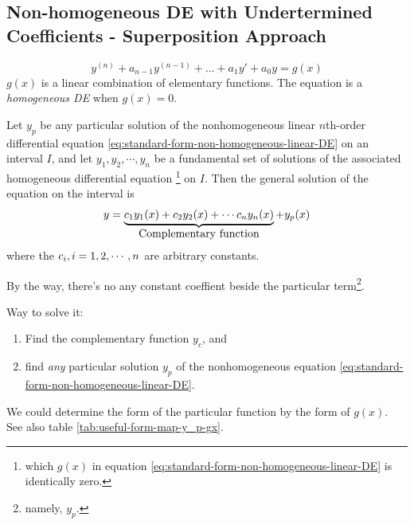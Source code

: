 \subsection{Non-homogeneous DE with Undertermined Coefficients - Superposition Approach}

\begin{definition}
    \label{def:non-homo-linear-DE}
    \begin{equation}\label{eq:standard-form-non-homogeneous-linear-DE}
        y^{(n)} + a_{n-1}y^{(n-1)} + \ldots + a_1y' + a_0y = g(x)
    \end{equation}
    $g(x)$ is a linear combination of elementary functions.
    The equation is a \emph{homogeneous DE} 
    when $g(x) = 0$.
\end{definition}

\begin{theorem}
    \label{general-sln-non-homo-DE}
    Let $y_p$  be any particular solution of 
    the nonhomogeneous linear $n$th-order
    differential equation \ref{eq:standard-form-non-homogeneous-linear-DE}
    on an interval $I$, 
    and let $y_1, y_2, \cdots, y_n$ be a fundamental set of 
    solutions of the associated homogeneous differential equation
    \footnote{
        which $g(x)$ in equation 
        \ref{eq:standard-form-non-homogeneous-linear-DE} 
        is identically zero.
    }
    on $I$.
    Then the general solution of the equation on the interval is
    \[
        y = 
        \underbrace{
            c_1 y_1(x) +
            c_2 y_2(x) +
            \cdots
            c_n y_n(x) 
        }_{\mathclap{\mbox{
            Complementary function
        }}}
        + y_p(x)
    \]
    where the $\cramped{c_i}, i = 1, 2, \cdots, n$ are arbitrary constants.
\end{theorem}
By the way, there's no any constant coeffient beside 
the particular term\footnote{namely, $y_p$.}.

Way to solve it:
\begin{enumerate}
    \item Find the complementary function $y_c$, and 
    \item find \emph{any} particular solution $y_p$ of 
        the nonhomogeneous equation 
        \ref{eq:standard-form-non-homogeneous-linear-DE}.
\end{enumerate}
We could determine the form of 
the particular function by the form of $g(x)$.
See also table \ref{tab:useful-form-map-y_p-gx}.

